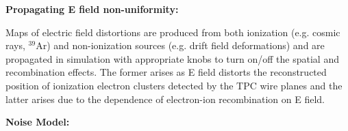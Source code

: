 \textbf{Propagating E field non-uniformity:} 

Maps of electric field distortions are produced from both ionization (e.g. cosmic rays, ${}^{39}$Ar) and non-ionization sources (e.g. drift field deformations) and are propagated in simulation with appropriate knobs to turn on\slash off the spatial and recombination effects. The former arises as E field distorts the reconstructed position of ionization electron clusters detected by the TPC wire planes and the latter arises due to the dependence of electron-ion recombination on E field.

\textbf{Noise Model:} 



